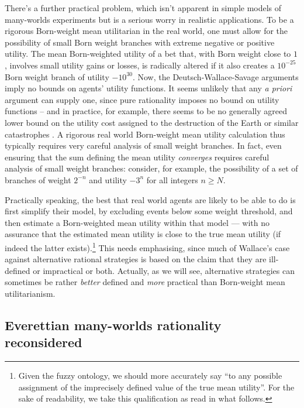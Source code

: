 \documentclass[aps,
pra,epsfig,12pt]{revtex4}
\begin{document}
There's a further practical problem, which isn't apparent in simple
models of many-worlds experiments but is a serious worry in 
realistic applications.  To be a rigorous Born-weight
mean utilitarian in the real world, one must allow for the possibility of   
small Born weight branches with extreme negative or positive utility.
The mean Born-weighted utility of a bet that, with 
Born weight close to $1$, involves 
small utility gains or 
losses, is radically altered if it also creates a $10^{-25}$ Born weight 
branch of utility $-10^{30}$.   Now, the Deutsch-Wallace-Savage arguments imply
no bounds on agents' utility functions.   It seems unlikely that
any {\it a priori} argument can supply one, since pure rationality 
imposes no bound on utility functions -- and in practice, for example,
there seems to be no generally agreed lower bound on the utility cost 
assigned to the destruction of the Earth or similar catastrophes \cite{akrisk}. 
A rigorous real world Born-weight mean utility calculation 
thus typically requires very careful analysis of small weight branches.   
In fact, even ensuring that the sum defining the mean 
utility {\it converges} requires
careful analysis of small weight branches: consider, for example,
the possibility of a set 
of branches of weight $2^{-n}$ and utility $-3^n$ for all integers $n \geq N$.  

Practically speaking, the best that real world agents are likely to be able
to do is first simplify their model, by excluding events below
some weight threshold, and then estimate a Born-weighted mean 
utility within that model --- with no assurance that the estimated 
mean utility is close to the true mean utility (if indeed the
latter exists).\footnote{
Given the fuzzy ontology, we should more accurately
say ``to any possible assignment of the imprecisely
defined value of the true mean utility''.   For the sake of 
readability, we take this qualification as read in what follows.} 
This needs emphasising, since much of Wallace's case 
against alternative rational strategies is based on the claim 
that they are ill-defined or impractical or both.  
Actually, as we will see, alternative
strategies can sometimes
be rather {\it better} defined and {\it more} practical 
than Born-weight mean utilitarianism. 

\subsection{Everettian many-worlds rationality reconsidered}
\end{document}
